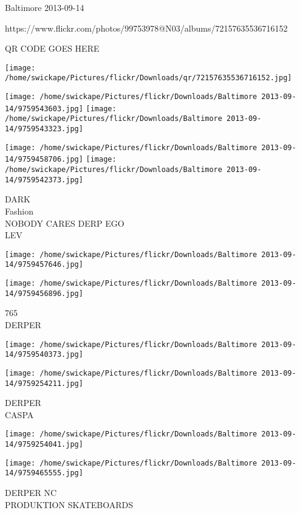 \documentclass[10pt,letterpaper]{article}
\begin{document}
Baltimore 2013-09-14

https://www.flickr.com/photos/99753978@N03/albums/72157635536716152

QR CODE GOES HERE

\texttt{[image: /home/swickape/Pictures/flickr/Downloads/qr/72157635536716152.jpg]}
\pagebreak

\texttt{[image: /home/swickape/Pictures/flickr/Downloads/Baltimore 2013-09-14/9759543603.jpg]}
\texttt{[image: /home/swickape/Pictures/flickr/Downloads/Baltimore 2013-09-14/9759543323.jpg]}

\texttt{[image: /home/swickape/Pictures/flickr/Downloads/Baltimore 2013-09-14/9759458706.jpg]}
\texttt{[image: /home/swickape/Pictures/flickr/Downloads/Baltimore 2013-09-14/9759542373.jpg]}

DARK\\
Fashion\\
NOBODY CARES DERP EGO\\
LEV\\
\pagebreak

\texttt{[image: /home/swickape/Pictures/flickr/Downloads/Baltimore 2013-09-14/9759457646.jpg]}

\vspace{0.25in}
\texttt{[image: /home/swickape/Pictures/flickr/Downloads/Baltimore 2013-09-14/9759456896.jpg]}

765\\
DERPER\\
\pagebreak

\texttt{[image: /home/swickape/Pictures/flickr/Downloads/Baltimore 2013-09-14/9759540373.jpg]}

\vspace{0.25in}
\texttt{[image: /home/swickape/Pictures/flickr/Downloads/Baltimore 2013-09-14/9759254211.jpg]}

DERPER\\
CASPA\\
\pagebreak

\texttt{[image: /home/swickape/Pictures/flickr/Downloads/Baltimore 2013-09-14/9759254041.jpg]}

\vspace{0.25in}
\texttt{[image: /home/swickape/Pictures/flickr/Downloads/Baltimore 2013-09-14/9759465555.jpg]}

DERPER NC\\
PRODUKTION SKATEBOARDS\\
\pagebreak
\end{document}
